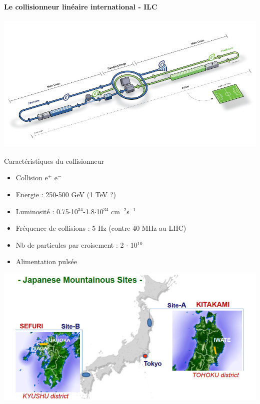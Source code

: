 \documentclass[8pt]{beamer}
\begin{document}
  \begin{frame}
  \frametitle{\secname}
  \framesubtitle{Le collisionneur linéaire international - ILC}
    \begin{center}
      \includegraphics[width=0.6\linewidth]{ilc_layout.jpg}
    \end{center}
    \begin{minipage}{0.51\linewidth}
      \begin{block}{Caractéristiques du collisionneur}
        \begin{itemize}
          \item Collision e$^{+}$ e$^{-}$
          \item Energie : 250-500 GeV (1 TeV ?)
          \item Luminosité : 0.75$\cdot$10$^{34}$-1.8$\cdot$10$^{34}$ cm$^{-2}$s$^{-1}$
          \item Fréquence de collisions : 5 Hz (contre 40 MHz au LHC)
          \item Nb de particules par croisement : 2 $\cdot$ 10$^{10}$
          \item Alimentation pulsée
        \end{itemize}
      \end{block}
    \end{minipage} \hfill
    \begin{minipage}{0.46\linewidth}
      \includegraphics[width=\linewidth]{japanese_sites.jpg}
    \end{minipage}
  \end{frame}
  
\end{document}
